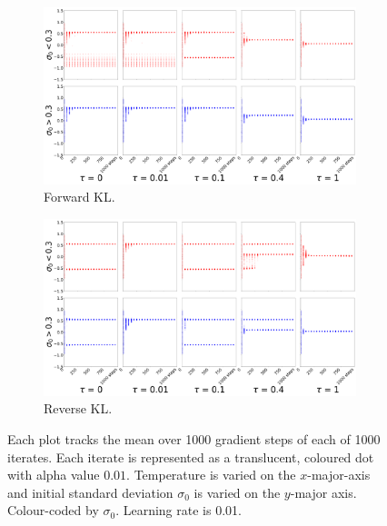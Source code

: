 \documentclass[twoside,11pt]{article}
\begin{document}
\begin{figure}[!htb]
  \centering
  \begin{subfigure}[b]{1\linewidth}
    \centering
    \includegraphics[width=\columnwidth]{figs/bandit/notlearnQ/modes=1/rmsprop/mean_forward_optim=rmsprop_modes=1_lr=0.01.png}
    \caption{Forward KL.}
    \label{fig:bandit-mean-forward-rmsprop}
  \end{subfigure}
  
  \begin{subfigure}[b]{1\linewidth}
    \centering
    \includegraphics[width=\columnwidth]{figs/bandit/notlearnQ/modes=1/rmsprop/mean_reverse_optim=rmsprop_modes=1_lr=0.01.png}
    \caption{Reverse KL.}
    \label{fig:bandit-mean-reverse-rmsprop}
  \end{subfigure}
  \caption{Each plot tracks the mean over 1000 gradient steps of each of 1000 iterates. Each iterate is represented as a translucent, coloured dot with alpha value $0.01$. Temperature is varied on the $x$-major-axis and initial standard deviation $\sigma_0$ is varied on the $y$-major axis. Colour-coded by $\sigma_0$. Learning rate is 0.01.}
\end{figure}
\end{document}
